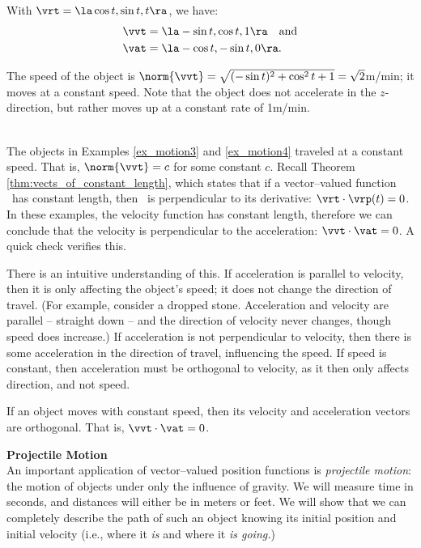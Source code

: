 {With $\vrt = \la \cos t,\sin t, t\ra$, we have:
\begin{align*}
\vvt &= \la -\sin t, \cos t, 1\ra \quad \text{and} \\
\vat &= \la -\cos t, -\sin t, 0\ra.
\end{align*}

The speed of the object is $\norm{\vvt} = \sqrt{(-\sin t)^2+\cos^2t+1} = \sqrt{2}$m/min; it moves at a constant speed. Note that the object does not accelerate in the $z$-direction, but rather moves up at a constant rate of 1m/min.
}\\

The objects in Examples \ref{ex_motion3} and \ref{ex_motion4} traveled at a constant speed. That is, $\norm{\vvt} = c$ for some constant $c$. Recall Theorem \ref{thm:vects_of_constant_length}, which states that if a vector--valued function \vrt\ has constant length, then \vrt\ is perpendicular to its derivative: $\vrt\cdot\vrp(t) = 0$. In these examples, the velocity function has constant length, therefore we can conclude that the velocity is perpendicular to the acceleration: $\vvt\cdot\vat = 0$. A quick check verifies this.

There is an intuitive understanding of this. If acceleration is parallel to velocity, then it is only affecting the object's speed; it does not change the direction of travel. (For example, consider a dropped stone. Acceleration and velocity are parallel -- straight down -- and the direction of velocity never changes, though speed does increase.) If acceleration is not perpendicular to velocity, then there is some acceleration in the direction of travel, influencing the speed. If speed is constant, then acceleration must be orthogonal to velocity, as it then only affects direction, and not speed.

{If an object moves with constant speed, then its velocity and acceleration vectors are orthogonal. That is, $\vvt\cdot\vat=0$.
}


\noindent\textbf{\large Projectile Motion}\\

An important application of vector--valued position functions is \emph{projectile motion}: the motion of objects under only the influence of gravity. We will measure time in seconds, and distances will either be in meters or feet. We will show that we can completely describe the path of such an object knowing its initial position and initial velocity (i.e., where it \emph{is} and where it \emph{is going.})

